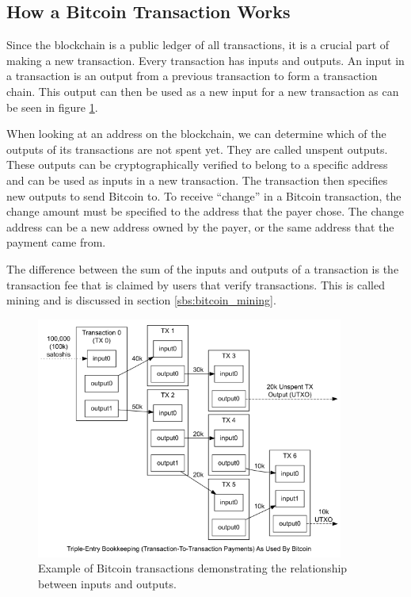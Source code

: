 \subsection{How a Bitcoin Transaction Works}

Since the blockchain is a public ledger of all transactions, it is a crucial part of making a new transaction. Every transaction has inputs and outputs. An input in a transaction is an output from a previous transaction to form a transaction chain. This output can then be used as a new input for a new transaction as can be seen in figure \ref{fig:transactions}.

 When looking at an address on the blockchain, we can determine which of the outputs of its transactions are not spent yet. They are called unspent outputs. These outputs can be cryptographically verified to belong to a specific address and can be used as inputs in a new transaction. The transaction then specifies new outputs to send Bitcoin to. To receive ``change'' in a Bitcoin transaction, the change amount must be specified to the address that the payer chose. The change address can be a new address owned by the payer, or the same address that the payment came from.

The difference between the sum of the inputs and outputs of a transaction is the transaction fee that is claimed by users that verify transactions. This is called mining and is discussed in section \ref{sbs:bitcoin_mining}.

\begin{figure}
  \centering
  	\caption{Example of Bitcoin transactions demonstrating the relationship between inputs and outputs\cite{bitcoinOrg}.} 
    \includegraphics[width=0.9\textwidth]{figs/en-transaction-propagation.png}
   
   \label{fig:transactions}
\end{figure}

